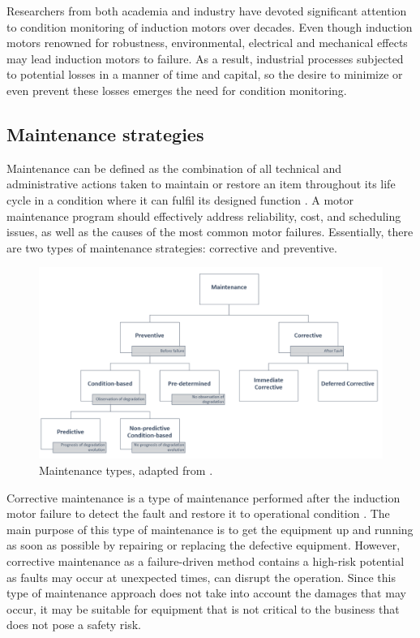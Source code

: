 Researchers from both academia and industry have devoted significant attention to condition monitoring of induction motors over decades. Even though induction motors renowned for robustness, environmental, electrical and mechanical effects may lead induction motors to failure. As a result, industrial processes subjected to potential losses in a manner of time and capital, so the desire to minimize or even prevent these losses emerges the need for condition monitoring. 

\subsection{Maintenance strategies}

Maintenance can be defined as the combination of all technical and administrative actions taken to maintain or restore an item throughout its life cycle in a condition where it can fulfil its designed function \cite{en201713306}. A motor maintenance program should effectively address reliability, cost, and scheduling issues, as well as the causes of the most common motor failures. Essentially, there are two types of maintenance strategies: corrective and preventive. 

\begin{figure}[h]
	\centering
	\includegraphics[width=400pt,keepaspectratio=true]{./fig/maintenance.PNG}
	\caption{Maintenance types, adapted from \cite{en201713306}.}	
	\label{maintenance}
\end{figure}

Corrective maintenance is a type of maintenance performed after the induction motor failure to detect the fault and restore it to operational condition \cite{en201713306}. The main purpose of this type of maintenance is to get the equipment up and running as soon as possible by repairing or replacing the defective equipment. However, corrective maintenance as a failure-driven method contains a high-risk potential as faults may occur at unexpected times, can disrupt the operation. Since this type of maintenance approach does not take into account the damages that may occur, it may be suitable for equipment that is not critical to the business that does not pose a safety risk.

